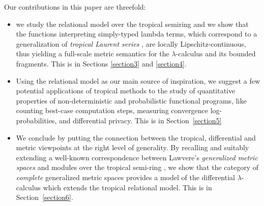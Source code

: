 Our contributions in this paper are threefold:
\begin{itemize}

\item we study the relational model over the tropical semiring  and we show that the functions interpreting simply-typed lambda terms, which correspond to a generalization of \emph{tropical Laurent series} \cite{Porzio2021}, are locally Lipschitz-continuous, thus yielding a full-scale metric semantics for the $\lambda$-calculus and its bounded fragments. This is in Sections \ref{section3} and \ref{section4}.


\item Using the relational model as our main source of inspiration,  we suggest a few potential applications of tropical methods to the study of quantitative properties of non-deterministic and probabilistic functional programs, like counting best-case computation steps, 
measuring convergence log-probabilities, and 
differential privacy. This is in Section~\ref{section5}

\item We conclude 
by putting the connection between the 
tropical, differential and metric viewpoints at the right level of generality.
By recalling and suitably extending a well-known correspondence between Lawvere's \emph{generalized metric spaces} \cite{Lawvere1973, Stubbe2014} and modules over the tropical semi-ring \cite{Russo2007}, we show that the category of \emph{complete} generalized metric spaces provides a model of the differential $\lambda$-calculus which extends the tropical relational model. This is in Section~\ref{section6}.
\end{itemize}
%
%
%
%
%
%
%
%
%


